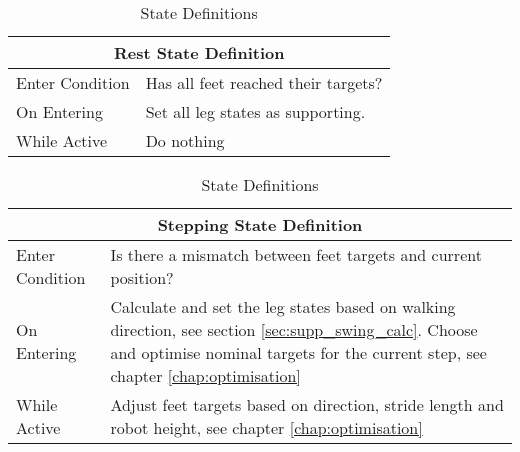            \begin{table}[h]
                \center
                \begin{tabularx}{\textwidth}{|l|X|}
                    \hline
                    \multicolumn{2}{|c|}{Rest State Definition} \\
                    \hline
                    Enter Condition & Has all feet reached their targets? \\
                    \hline
                    On Entering & Set all leg states as supporting. \\
                    \hline
                    While Active & Do nothing \\
                    \hline
                \end{tabularx}
                
                \bigskip
                \noindent
                \begin{tabularx}{\textwidth}{|l|X|}
                    \hline
                    \multicolumn{2}{|c|}{Stepping State Definition} \\
                    \hline
                    Enter Condition & Is there a mismatch between feet targets and current position? \\
                    \hline
                    On Entering & Calculate and set the leg states based on walking direction, see section \ref{sec:supp_swing_calc}. Choose and optimise nominal targets
                    for the current step, see chapter \ref{chap:optimisation}\\
                    \hline
                    While Active & Adjust feet targets based on direction, stride length and robot height, see chapter \ref{chap:optimisation}\\
                    \hline
                \end{tabularx}
                \caption{State Definitions}
                \label{tab:state_defs}
            \end{table}

        \newpage
